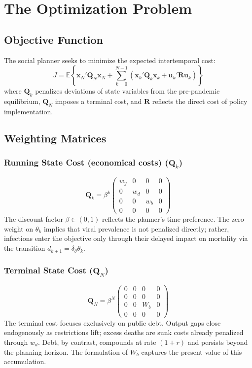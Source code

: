 \vspace{2mm}



\section{The Optimization Problem}

\subsection{Objective Function}
The social planner seeks to minimize the expected intertemporal cost:
\begin{equation}
J = \mathbb{E} \left\{ \bm{x}_N' \bm{Q}_N \bm{x}_N + \sum_{k=0}^{N-1} \left( \bm{x}_k' \bm{Q}_k \bm{x}_k + \bm{u}_k' \bm{R} \bm{u}_k \right) \right\}
\end{equation}
where $\bm{Q}_k$ penalizes deviations of state variables from the 
pre-pandemic equilibrium, $\bm{Q}_N$ imposes a terminal cost, and 
$\bm{R}$ reflects the direct cost of policy implementation.

\subsection{Weighting Matrices}

\subsubsection{Running State Cost (economical costs) ($\bm{Q}_k$)}
\begin{equation}
\bm{Q}_k = \beta^k 
\begin{pmatrix} 
w_y & 0 & 0 & 0 \\ 
0 & w_d & 0 & 0 \\ 
0 & 0 & w_b & 0 \\ 
0 & 0 & 0 & 0 
\end{pmatrix}
\end{equation}
The discount factor $\beta \in (0,1)$ reflects the planner's time 
preference. The zero weight on $\theta_k$ implies that viral 
prevalence is not penalized directly; rather, infections enter the 
objective only through their delayed impact on mortality via the 
transition $d_{k+1} = \delta_\theta \theta_k$.

\subsubsection{Terminal State Cost ($\bm{Q}_N$)}
\begin{equation}
\bm{Q}_N = \beta^N
\begin{pmatrix} 
0 & 0 & 0 & 0 \\ 
0 & 0 & 0 & 0 \\ 
0 & 0 & W_b & 0 \\ 
0 & 0 & 0 & 0 
\end{pmatrix}
\end{equation}
The terminal cost focuses exclusively on public debt. Output gaps 
close endogenously as restrictions lift; excess deaths are sunk 
costs already penalized through $w_d$. Debt, by contrast, compounds 
at rate $(1+r)$ and persists beyond the planning horizon. The 
formulation of $W_b$ captures the present value of this 
accumulation.

